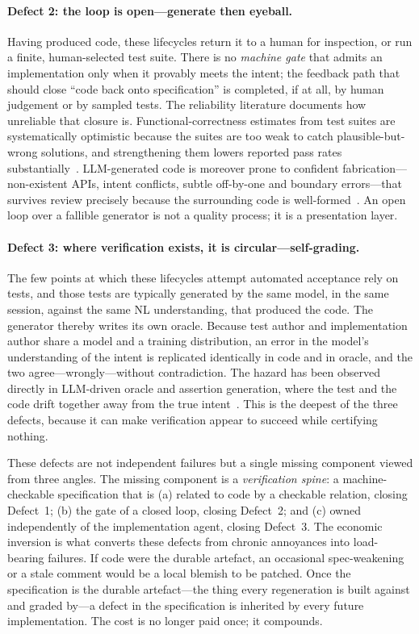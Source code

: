 \paragraph{Defect 2: the loop is open---generate then eyeball.} Having produced code, these lifecycles return it to a human for inspection, or run a finite, human-selected test suite. There is no \emph{machine gate} that admits an implementation only when it provably meets the intent; the feedback path that should close ``code back onto specification'' is completed, if at all, by human judgement or by sampled tests. The reliability literature documents how unreliable that closure is. Functional-correctness estimates from test suites are systematically optimistic because the suites are too weak to catch plausible-but-wrong solutions, and strengthening them lowers reported pass rates substantially~\cite{liu2023evalplus,chen2021codex,austin2021mbpp}. LLM-generated code is moreover prone to confident fabrication---non-existent APIs, intent conflicts, subtle off-by-one and boundary errors---that survives review precisely because the surrounding code is well-formed~\cite{zhang2025hallucination}. An open loop over a fallible generator is not a quality process; it is a presentation layer.

\paragraph{Defect 3: where verification exists, it is circular---self-grading.} The few points at which these lifecycles attempt automated acceptance rely on tests, and those tests are typically generated by the same model, in the same session, against the same NL understanding, that produced the code. The generator thereby writes its own oracle. Because test author and implementation author share a model and a training distribution, an error in the model's understanding of the intent is replicated identically in code and in oracle, and the two agree---wrongly---without contradiction. The hazard has been observed directly in LLM-driven oracle and assertion generation, where the test and the code drift together away from the true intent~\cite{liu2026oracle,watson2020atlas}. This is the deepest of the three defects, because it can make verification appear to succeed while certifying nothing.

These defects are not independent failures but a single missing component viewed from three angles. The missing component is a \emph{verification spine}: a machine-checkable specification that is (a) related to code by a checkable relation, closing Defect~1; (b) the gate of a closed loop, closing Defect~2; and (c) owned independently of the implementation agent, closing Defect~3. The economic inversion is what converts these defects from chronic annoyances into load-bearing failures. If code were the durable artefact, an occasional spec-weakening or a stale comment would be a local blemish to be patched. Once the specification is the durable artefact---the thing every regeneration is built against and graded by---a defect in the specification is inherited by every future implementation. The cost is no longer paid once; it compounds.

